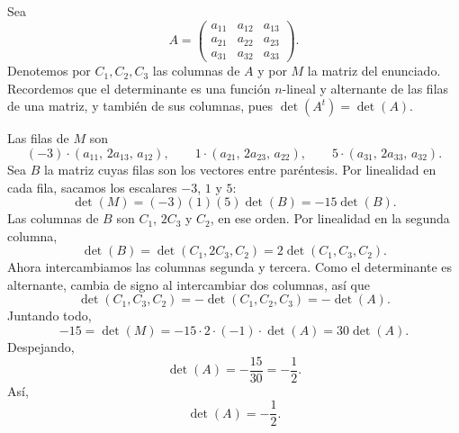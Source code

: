 \documentclass[12pt,a4paper]{article}
\begin{document}
    \begin{solucion}
        Sea
        \begin{equation*}
            A=
            \begin{pmatrix}
                a_{11} & a_{12} & a_{13}\\
                a_{21} & a_{22} & a_{23}\\
                a_{31} & a_{32} & a_{33}
            \end{pmatrix}.
        \end{equation*}
        Denotemos por $C_{1},C_{2},C_{3}$ las columnas de $A$ y por $M$ la matriz del enunciado. Recordemos que el determinante es una función $n$-lineal y alternante de las filas de una matriz, y también de sus columnas, pues $\det(A^{t})=\det(A)$.

        Las filas de $M$ son
        \begin{equation*}
            (-3)\cdot(a_{11},\,2a_{13},\,a_{12}),\qquad 1\cdot(a_{21},\,2a_{23},\,a_{22}),\qquad 5\cdot(a_{31},\,2a_{33},\,a_{32}).
        \end{equation*}
        Sea $B$ la matriz cuyas filas son los vectores entre paréntesis. Por linealidad en cada fila, sacamos los escalares $-3$, $1$ y $5$:
        \begin{equation*}
            \det(M)=(-3)(1)(5)\det(B)=-15\det(B).
        \end{equation*}
        Las columnas de $B$ son $C_{1}$, $2C_{3}$ y $C_{2}$, en ese orden. Por linealidad en la segunda columna,
        \begin{equation*}
            \det(B)=\det(C_{1},2C_{3},C_{2})=2\det(C_{1},C_{3},C_{2}).
        \end{equation*}
        Ahora intercambiamos las columnas segunda y tercera. Como el determinante es alternante, cambia de signo al intercambiar dos columnas, así que
        \begin{equation*}
            \det(C_{1},C_{3},C_{2})=-\det(C_{1},C_{2},C_{3})=-\det(A).
        \end{equation*}
        Juntando todo,
        \begin{equation*}
            -15=\det(M)=-15\cdot2\cdot(-1)\cdot\det(A)=30\det(A).
        \end{equation*}
        Despejando,
        \begin{equation*}
            \det(A)=-\frac{15}{30}=-\frac{1}{2}.
        \end{equation*}
        Así,
        \begin{equation*}
            \det(A)=-\frac{1}{2}.
        \end{equation*}
    \end{solucion}
\end{document}
